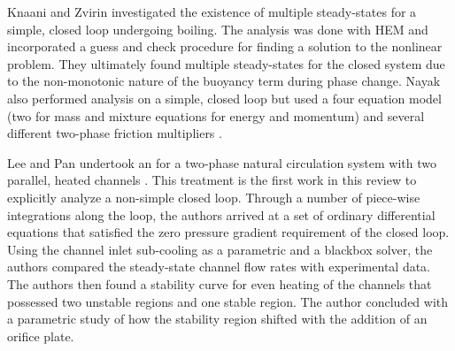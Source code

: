 Knaani and Zvirin investigated the existence of multiple steady-states for a simple, closed loop undergoing boiling\cite{knaani_bifurcation_1993}.
The analysis was done with HEM and incorporated a guess and check procedure for finding a solution to the nonlinear problem.
They ultimately found multiple steady-states for the closed system due to the non-monotonic nature of the buoyancy term during phase change.
Nayak \etal also performed analysis on a simple, closed loop but used a four equation model (two for mass and mixture equations for energy and momentum) and several different two-phase friction multipliers \cite{nayak_study_2007}.

Lee and Pan undertook an  for a two-phase natural circulation system with two parallel, heated channels \cite{lee_nonlinear_2005}.
This treatment is the first work in this review to explicitly analyze a non-simple closed loop.
Through a number of piece-wise integrations along the loop, the authors arrived at a set of ordinary differential equations that satisfied the zero pressure gradient requirement of the closed loop.
Using the channel inlet sub-cooling as a parametric and a blackbox solver, the authors compared the steady-state channel flow rates with experimental data.
The authors then found a stability curve for even heating of the channels that possessed two unstable regions and one stable region.
The author concluded with a parametric study of how the stability region shifted with the addition of an orifice plate.



